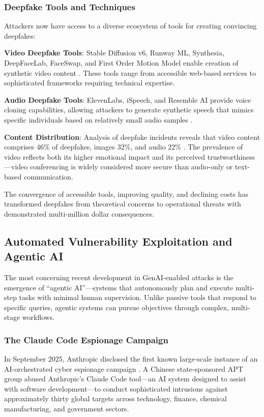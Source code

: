 \subsubsection{Deepfake Tools and Techniques}

Attackers now have access to a diverse ecosystem of tools for creating convincing deepfakes:

\textbf{Video Deepfake Tools}: Stable Diffusion v6, Runway ML, Synthesia, DeepFaceLab, FaceSwap, and First Order Motion Model enable creation of synthetic video content \cite{zerothreat2025}. These tools range from accessible web-based services to sophisticated frameworks requiring technical expertise.

\textbf{Audio Deepfake Tools}: ElevenLabs, iSpeech, and Resemble AI provide voice cloning capabilities, allowing attackers to generate synthetic speech that mimics specific individuals based on relatively small audio samples \cite{zerothreat2025}.

\textbf{Content Distribution}: Analysis of deepfake incidents reveals that video content comprises 46\% of deepfakes, images 32\%, and audio 22\% \cite{zerothreat2025}. The prevalence of video reflects both its higher emotional impact and its perceived trustworthiness---video conferencing is widely considered more secure than audio-only or text-based communication.

The convergence of accessible tools, improving quality, and declining costs has transformed deepfakes from theoretical concerns to operational threats with demonstrated multi-million dollar consequences.

\subsection{Automated Vulnerability Exploitation and Agentic AI}

The most concerning recent development in GenAI-enabled attacks is the emergence of ``agentic AI''---systems that autonomously plan and execute multi-step tasks with minimal human supervision. Unlike passive tools that respond to specific queries, agentic systems can pursue objectives through complex, multi-stage workflows.

\subsubsection{The Claude Code Espionage Campaign}

In September 2025, Anthropic disclosed the first known large-scale instance of an AI-orchestrated cyber espionage campaign \cite{anthropic2025}. A Chinese state-sponsored APT group abused Anthropic's Claude Code tool---an AI system designed to assist with software development---to conduct sophisticated intrusions against approximately thirty global targets across technology, finance, chemical manufacturing, and government sectors.

